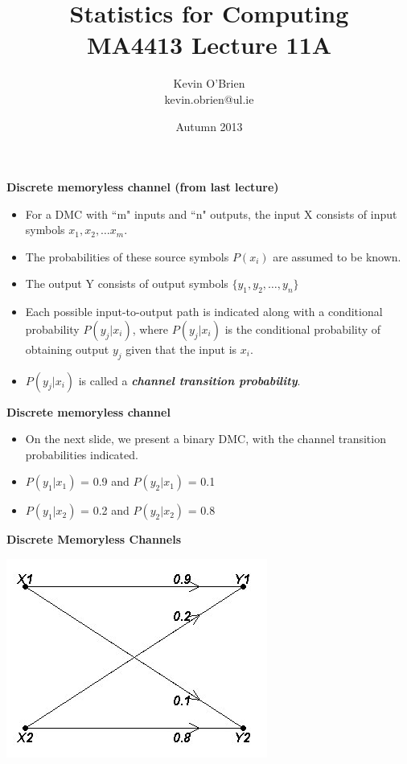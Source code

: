 \documentclass[a4]{beamer}
\title[MA4413]{Statistics for Computing \\ {\normalsize MA4413 Lecture 11A}}
\author[Kevin O'Brien]{Kevin O'Brien \\ {\scriptsize kevin.obrien@ul.ie}}
\date{Autumn 2013}
\institute[Maths \& Stats]{Dept. of Mathematics \& Statistics, \\ University \textit{of} Limerick}
\begin{document}
\titlepage



\noindent \textbf{Discrete memoryless channel (from last lecture)}
\begin{itemize}
\item For a DMC with ``m" inputs and ``n" outputs, the input X consists of input symbols $x_1, x_2, \ldots x_m$.
\item The probabilities of these source symbols $P(x_i)$ are assumed to be known.
\item The output Y consists of output symbols $\{y_1,y_2,\ldots, y_n \}$
\item Each possible input-to-output path is indicated along with a conditional probability $P(y_j|x_i)$, where $P(y_j|x_i)$  is the conditional probability of
obtaining output $y_j$ given that the input is $x_i$. \item $P(y_j|x_i)$ is called a \textbf{\emph{channel transition probability}}.
\end{itemize}


\noindent \textbf{Discrete memoryless channel}
\vspace{-1cm}
\begin{itemize}
\item On the next slide, we present a binary DMC, with the channel transition probabilities indicated.
\item $P(y_1|x_1)$ = 0.9  and $P(y_2|x_1)$ = 0.1
\item $P(y_1|x_2)$ = 0.2  and $P(y_2|x_2)$ = 0.8
\end{itemize}


{
\noindent \textbf{Discrete Memoryless Channels}

\begin{center}
\includegraphics[scale=0.54]{10Bnet2}
\end{center}
}
\end{document}
